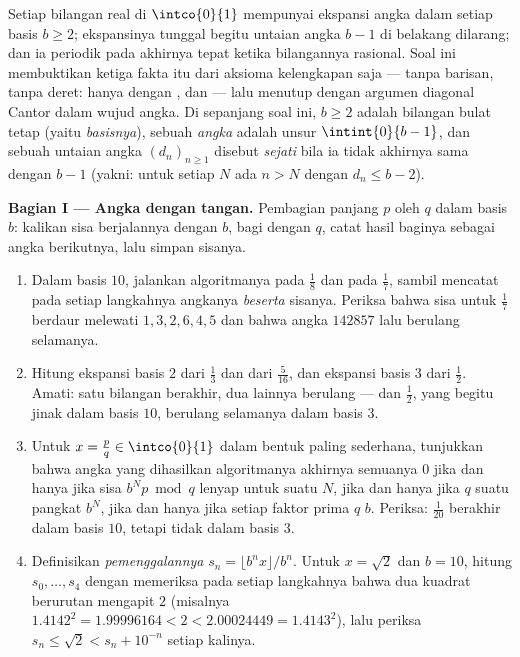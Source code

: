 \begin{problem}
\label{pb:b1:reals:1}
Setiap bilangan real di $\intco{0}{1}$ mempunyai ekspansi angka dalam setiap basis
$b \geq 2$; ekspansinya tunggal begitu untaian angka $b - 1$ di
belakang dilarang; dan ia periodik pada akhirnya tepat
ketika bilangannya rasional. Soal ini membuktikan ketiga fakta itu
dari aksioma kelengkapan saja --- tanpa barisan, tanpa deret:
hanya dengan ,  dan 
--- lalu menutup dengan argumen diagonal Cantor dalam wujud angka.
Di sepanjang soal ini, $b \geq 2$ adalah bilangan bulat tetap (yaitu \emph{basisnya}), sebuah
\emph{angka} adalah unsur $\intint{0}{b-1}$, dan sebuah untaian
angka $(d_n)_{n \geq 1}$ disebut \emph{sejati} bila ia tidak
akhirnya sama dengan $b - 1$ (yakni: untuk setiap $N$ ada $n >
N$ dengan $d_n \leq b - 2$).

\medskip
\noindent\textbf{Bagian I --- Angka dengan tangan.} Pembagian panjang $p$
oleh $q$ dalam basis $b$: kalikan sisa berjalannya dengan $b$, bagi
dengan $q$, catat hasil baginya sebagai angka berikutnya, lalu simpan sisanya.
\begin{enumerate}
  \item Dalam basis $10$, jalankan algoritmanya pada $\frac 18$ dan pada
        $\frac 17$, sambil mencatat pada setiap langkahnya angkanya \emph{beserta}
        sisanya. Periksa bahwa sisa untuk $\frac 17$
        berdaur melewati $1, 3, 2, 6, 4, 5$ dan bahwa angka
        $142857$ lalu berulang selamanya.
  \item Hitung ekspansi basis $2$ dari $\frac 13$ dan dari
        $\frac{5}{16}$, dan ekspansi basis $3$ dari $\frac 12$.
        Amati: satu bilangan berakhir, dua lainnya berulang ---
        dan $\frac 12$, yang begitu jinak dalam basis $10$, berulang selamanya dalam
        basis $3$.
  \item Untuk $x = \frac pq \in \intco{0}{1}$ dalam bentuk paling sederhana, tunjukkan
        bahwa angka yang dihasilkan algoritmanya akhirnya semuanya
        $0$ jika dan hanya jika sisa $b^N p \bmod q$
        lenyap untuk suatu $N$, jika dan hanya jika $q$  suatu
        pangkat $b^N$, jika dan hanya jika setiap faktor prima $q$
         $b$. Periksa: $\frac{1}{20}$ berakhir dalam basis
        $10$, tetapi tidak dalam basis $3$.
  \item Definisikan \emph{pemenggalannya} $s_n = \lfloor b^n x \rfloor
        / b^n$. Untuk $x = \sqrt 2$ dan $b = 10$, hitung $s_0,
        \dots, s_4$ dengan memeriksa pada setiap langkahnya bahwa dua
        kuadrat berurutan mengapit $2$ (misalnya $1.4142^2
        = 1.99996164 < 2 < 2.00024449 = 1.4143^2$), lalu periksa
        $s_n \leq \sqrt 2 < s_n + 10^{-n}$ setiap kalinya.
\end{enumerate}


\end{problem}

